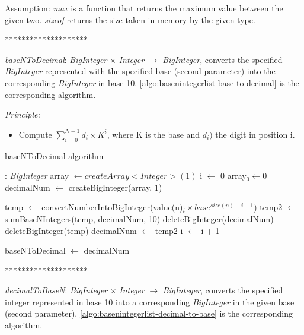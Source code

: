 \documentclass[book, nodocumentinfo]{upmethodology-document}
\newcommand{\separator}{\centerline{********************}}
\begin{document}
Assumption: \emph{max} is a function that returns the maximum value between the given two.
\emph{sizeof} returns the size taken in memory by the given type.

\separator

\emph{baseNToDecimal}: \emph{BigInteger} \(×\) \emph{Integer} \(\rightarrow\) \emph{BigInteger},
converts the specified \emph{BigInteger} represented with the specified base (second parameter)
into the corresponding \emph{BigInteger} in base 10.
\ref{algo:basenintegerlist-base-to-decimal} is the corresponding algorithm.

\emph{Principle:}
\begin{itemize}
    \item Compute \(\sum\limits_{i=0}^{N - 1}{d_i \times K^i}\), where K is the base and \(d_i)\) the digit in position i.
\end{itemize}

\begin{algorithm}[H]
    \caption{baseNToDecimal algorithm}
    \label{algo:basenintegerlist-base-to-decimal}

    \begin{algorithmic}
         : \emph{BigInteger}
            \State array \(\leftarrow createArray<Integer>(1)\)
            \State i \(\leftarrow\) 0
            \State array\(_0 \leftarrow 0\)
            \State decimalNum \(\leftarrow\) createBigInteger(array, 1)

                \State temp \(\leftarrow\) convertNumberIntoBigInteger(value(n)\(_i × base^{size(n) - i - 1}\))
                \State temp2 \(\leftarrow\) sumBaseNIntegers(temp, decimalNum, 10)
                \State deleteBigInteger(decimalNum)
                \State deleteBigInteger(temp)
                \State decimalNum \(\leftarrow\) temp2
                \State i \(\leftarrow\) i + 1
            \EndWhile

            \State baseNToDecimal \(\leftarrow\) decimalNum
        \EndFunction
    \end{algorithmic}
\end{algorithm}

\separator

\emph{decimalToBaseN}: \emph{BigInteger} \(×\) \emph{Integer} \(\rightarrow\) \emph{BigInteger},
converts the specified integer represented in base 10 into a corresponding \emph{BigInteger} in
the given base (second parameter).
\ref{algo:basenintegerlist-decimal-to-base} is the corresponding algorithm.
\end{document}
